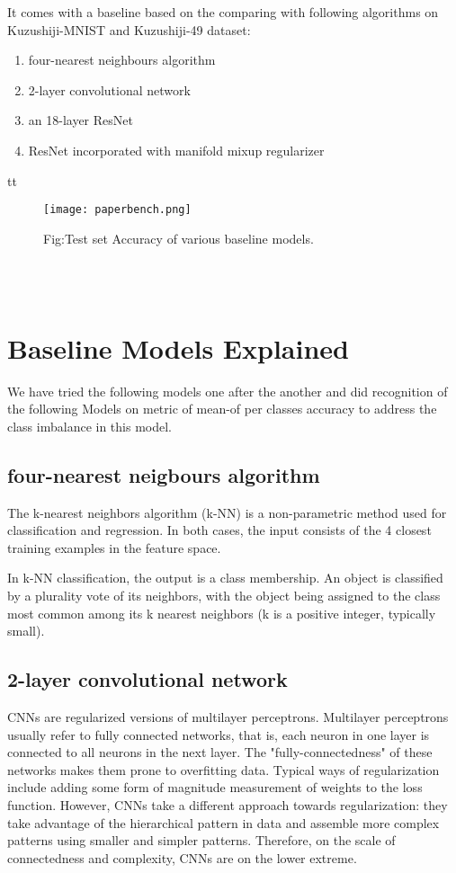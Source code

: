 \documentclass[12pt]{report}
\begin{document}
It comes with a baseline based on the comparing with following
algorithms on Kuzushiji-MNIST and Kuzushiji-49 dataset:
\begin{enumerate}
\item four-nearest neighbours algorithm
\item 2-layer convolutional network
\item an 18-layer ResNet
\item ResNet incorporated with manifold mixup regularizer
\end{enumerate}


tt

\begin{figure}[h]
\centering
\texttt{[image: paperbench.png]}
\caption{Fig:Test set Accuracy of various baseline models.}
\end{figure}
\\
\\
\section{Baseline Models Explained}

We have tried the following models one after the another and did
recognition of the
following Models on metric of mean-of per classes accuracy to address the class
imbalance in this model.

\subsection{ four-nearest neigbours algorithm}

The k-nearest neighbors algorithm (k-NN) is a non-parametric method used for
classification and regression. In both cases, the input consists of
the 4 closest
training examples in the feature space.

In k-NN classification, the output is a class membership. An object is
classified by a plurality vote of its neighbors, with the object being
assigned to the class most common among its k nearest neighbors (k is
a positive integer, typically small).

\subsection{2-layer convolutional network}

CNNs are regularized versions of multilayer perceptrons. Multilayer
perceptrons usually refer to fully connected networks, that is, each
neuron in one layer is connected to all neurons in the next layer. The
"fully-connectedness" of these networks makes them prone to
overfitting data. Typical ways of regularization include adding some
form of magnitude measurement of weights to the loss function.
However, CNNs take a different approach towards regularization: they
take advantage of the hierarchical pattern in data and assemble more
complex patterns using smaller and simpler patterns. Therefore, on the
scale of connectedness and complexity, CNNs are on the lower extreme.
\end{document}
